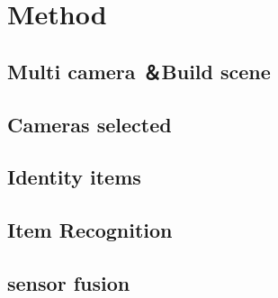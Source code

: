 \section{Method}

\subsection{Multi camera ＆Build scene}

\subsection{Cameras selected}

\subsection{Identity items}

\subsection{Item Recognition}

\subsection{sensor fusion}

